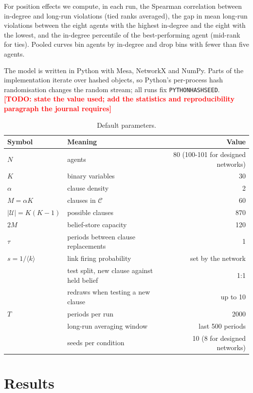 \documentclass[11pt]{article}
\newcommand{\todo}[1]{\textcolor{red}{\textbf{[TODO: #1]}}}
\begin{document}
For position effects we compute, in each run, the Spearman correlation between in-degree and long-run violations (tied ranks averaged), the gap in mean long-run violations between the eight agents with the highest in-degree and the eight with the lowest, and the in-degree percentile of the best-performing agent (mid-rank for ties). Pooled curves bin agents by in-degree and drop bins with fewer than five agents.

The model is written in Python with Mesa, NetworkX and NumPy. Parts of the implementation iterate over hashed objects, so Python's per-process hash randomisation changes the random stream; all runs fix \texttt{PYTHONHASHSEED}. \todo{state the value used; add the statistics and reproducibility paragraph the journal requires}

\begin{table}[H]
\centering
\caption{Default parameters.}
\label{tab:params}
\small
\begin{tabular}{@{}llr@{}}
\toprule
Symbol & Meaning & Value \\
\midrule
$N$ & agents & 80 (100-101 for designed networks) \\
$K$ & binary variables & 30 \\
$\alpha$ & clause density & 2 \\
$M = \alpha K$ & clauses in $\mathcal{C}$ & 60 \\
$|\mathcal{U}| = K(K-1)$ & possible clauses & 870 \\
$2M$ & belief-store capacity & 120 \\
$\tau$ & periods between clause replacements & 1 \\
$s = 1/\langle k\rangle$ & link firing probability & set by the network \\
 & test split, new clause against held belief & 1:1 \\
 & redraws when testing a new clause & up to 10 \\
$T$ & periods per run & 2000 \\
 & long-run averaging window & last 500 periods \\
 & seeds per condition & 10 (8 for designed networks) \\
\bottomrule
\end{tabular}
\end{table}


\section{Results}\label{sec:results}
\end{document}
